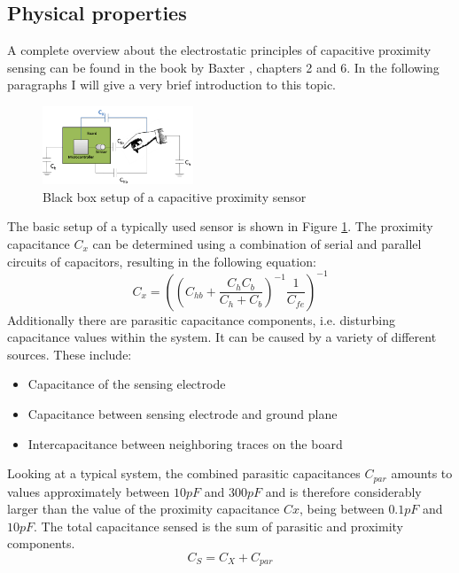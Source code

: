 \subsection{Physical properties}
A complete overview about the electrostatic principles of capacitive proximity sensing can be found in the book by Baxter \cite{Baxter1996}, chapters 2 and 6. In the following paragraphs I will give a very brief introduction to this topic.
\begin{figure}[h]
\centering
\includegraphics[width=0.4\textwidth]{images/cap_blackbox.png}
\caption{Black box setup of a capacitive proximity sensor}
\label{fig:cap_blackbox}
\end{figure}
The basic setup of a typically used sensor is shown in Figure \ref{fig:cap_blackbox}. The proximity capacitance \(C_{x}\) can be determined using a combination of serial and parallel circuits of capacitors, resulting in the following equation:
\begin{equation}
C_{x}=\left(\left(C_{hb}+\frac{C_{h}C_{b}}{C_{h}+C_{b}}\right)^{-1}\frac{1}{C_{fe}}\right)^{-1}
\end{equation}
Additionally there are parasitic capacitance components, i.e. disturbing capacitance values within the system. It can be caused by a variety of different sources. These include:
\begin{itemize}
\item Capacitance of the sensing electrode 
\item Capacitance between sensing electrode and ground plane
\item Intercapacitance between neighboring traces on the board
\end{itemize}
Looking at a typical system, the combined parasitic capacitances \(C_{par}\) amounts to values approximately between \(10pF\) and \(300pF\) and is therefore considerably larger than the value of the proximity capacitance \(Cx\), being between \(0.1pF\) and \(10pF\). The total capacitance sensed is the sum of parasitic and proximity components. 
\begin{equation}
C_{S}=C_{X}+C_{par}
\end{equation}

